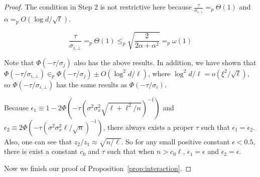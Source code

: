 \begin{proof}

The condition in Step 2 is not restrictive here because $\frac{\tau}{\sigma_{i,\bot}} =_p \Theta(1)$ and $\alpha =_p O(\log d/\sqrt{\ell})$.

\begin{equation}
    \frac{\tau}{\sigma_{i,\bot}} =_p \Theta(1) \leq_p \sqrt{\frac{2}{2\alpha+\alpha^2}} =_p \omega(1)
\end{equation}

Note that $\Phi\left(-\tau/ \sigma_{j}\right)$ also has the above results. In addition, we have shown that $\Phi\left(-\tau/ \sigma_{i,\bot}\right) \in_p \Phi\left(-\tau/ \sigma_{j}\right) \pm O(\log^2 d/\ell)$, where $\log^2 d/\ell = o(\xi^2 /\sqrt{\ell})$, so $\Phi\left(-\tau/ \sigma_{i,\bot}\right)$ has the same results as $\Phi\left(-\tau/ \sigma_{i}\right)$.

Because $\epsilon_1 \equiv 1-2\Phi\left(-\tau\left(\sigma^2\sigma^2_x \sqrt{\ell+\ell^2/n}\right)^{-1}\right)$ and $\epsilon_2 \equiv 2\Phi\left(-\tau(\sigma^2\sigma^2_x \ell/\sqrt{n})^{-1}\right)$, there always exists a proper $\tau$ such that $\epsilon_1 = \epsilon_2$. Also, one can see that $z_2/z_1 \approx \sqrt{n/\ell}$. So for any small positive constant $\epsilon < 0.5$, there is exist a constant $c_0$ and $\tau$ such that when $n>c_0\ell$, $\epsilon_1 = \epsilon$ and $\epsilon_2 = \epsilon$. 

Now we finish our proof of Proposition~\ref{prop:interaction}.
\end{proof}



